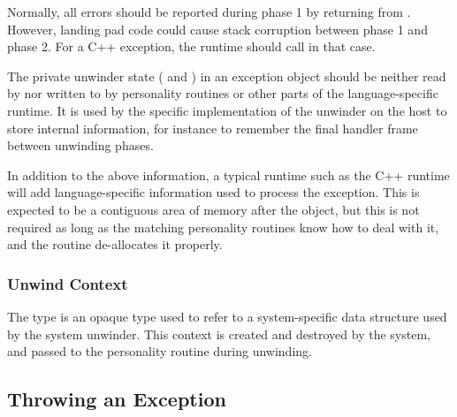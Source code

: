 Normally, all errors should be reported during phase 1 by returning
from . However, landing pad code could cause
stack corruption between phase 1 and phase 2. For a C++ exception,
the runtime should call  in that case.

The private unwinder state ( and ) in an exception
object should be neither read by nor written to by personality routines or
other parts of the language-specific runtime.  It is used by the specific
implementation of the unwinder on the host to store internal information,
for instance to remember the final handler frame between unwinding phases.

In addition to the above information, a typical runtime such as the
C++ runtime will add language-specific information used to process the
exception.  This is expected to be a contiguous area of memory after
the  object, but this is not required as
long as the matching personality routines know how to deal with it,
and the  routine de-allocates it properly.

\subsubsection{Unwind Context}

The  type is an opaque type used to refer to a
system-specific data structure used by the system unwinder.  This context
is created and destroyed by the system, and passed to the personality
routine during unwinding.


\subsection{Throwing an Exception}

\subsubsection{}


